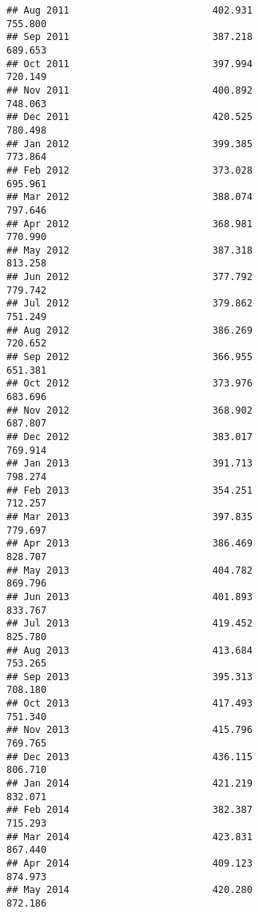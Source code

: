 \documentclass[
]{article}
\begin{document}
\begin{verbatim}
## Aug 2011                         402.931                           755.800
## Sep 2011                         387.218                           689.653
## Oct 2011                         397.994                           720.149
## Nov 2011                         400.892                           748.063
## Dec 2011                         420.525                           780.498
## Jan 2012                         399.385                           773.864
## Feb 2012                         373.028                           695.961
## Mar 2012                         388.074                           797.646
## Apr 2012                         368.981                           770.990
## May 2012                         387.318                           813.258
## Jun 2012                         377.792                           779.742
## Jul 2012                         379.862                           751.249
## Aug 2012                         386.269                           720.652
## Sep 2012                         366.955                           651.381
## Oct 2012                         373.976                           683.696
## Nov 2012                         368.902                           687.807
## Dec 2012                         383.017                           769.914
## Jan 2013                         391.713                           798.274
## Feb 2013                         354.251                           712.257
## Mar 2013                         397.835                           779.697
## Apr 2013                         386.469                           828.707
## May 2013                         404.782                           869.796
## Jun 2013                         401.893                           833.767
## Jul 2013                         419.452                           825.780
## Aug 2013                         413.684                           753.265
## Sep 2013                         395.313                           708.180
## Oct 2013                         417.493                           751.340
## Nov 2013                         415.796                           769.765
## Dec 2013                         436.115                           806.710
## Jan 2014                         421.219                           832.071
## Feb 2014                         382.387                           715.293
## Mar 2014                         423.831                           867.440
## Apr 2014                         409.123                           874.973
## May 2014                         420.280                           872.186

\end{verbatim}
\end{document}
